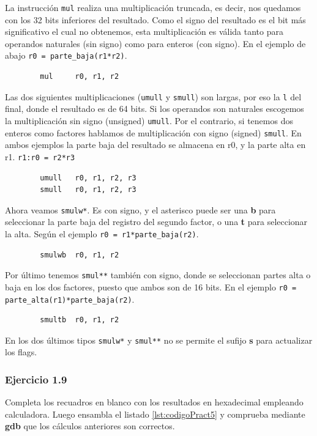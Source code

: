 La instrucción {\tt mul} realiza una multiplicación truncada, es decir,
nos quedamos con los 32 bits inferiores del resultado. Como el signo
del resultado es el bit más significativo el cual no obtenemos, esta
multiplicación es válida tanto para operandos naturales (sin signo) como
para enteros (con signo). En el ejemplo de abajo {\tt r0 = parte\_baja(r1*r2)}.

\begin{lstlisting}
        mul     r0, r1, r2
\end{lstlisting}

Las dos siguientes multiplicaciones ({\tt umull} y {\tt smull}) son largas,
por eso la {\tt l} del final, donde el resultado es de 64 bits. Si los
operandos son naturales escogemos la multiplicación sin signo (unsigned) {\tt umull}.
Por el contrario, si tenemos dos enteros como factores hablamos de
multiplicación con signo (signed) {\tt smull}. En ambos ejemplos la parte baja del
resultado se almacena en r0, y la parte alta en r1. {\tt r1:r0 = r2*r3}

\begin{lstlisting}
        umull   r0, r1, r2, r3
        smull   r0, r1, r2, r3
\end{lstlisting}

Ahora veamos {\tt smulw*}. Es con signo, y el asterisco puede ser una {\bf b} para
seleccionar la parte baja del registro del segundo factor, o una {\bf t} para
seleccionar la alta. Según el ejemplo {\tt r0 = r1*parte\_baja(r2)}.

\begin{lstlisting}
        smulwb  r0, r1, r2
\end{lstlisting}

Por último tenemos {\tt smul**} también con signo, donde se seleccionan partes
alta o baja en los dos factores, puesto que ambos son de 16 bits. En el ejemplo
{\tt r0 = parte\_alta(r1)*parte\_baja(r2)}.

\begin{lstlisting}
        smultb  r0, r1, r2
\end{lstlisting}

En los dos últimos tipos {\tt smulw*} y {\tt smul**} no se permite el sufijo {\bf s}
para actualizar los flags.

\subsubsection{Ejercicio 1.9}
Completa los recuadros en blanco con los resultados en hexadecimal empleando
calculadora. Luego ensambla el listado \ref{lst:codigoPract5} y comprueba
mediante {\bf gdb} que los cálculos anteriores son correctos.

